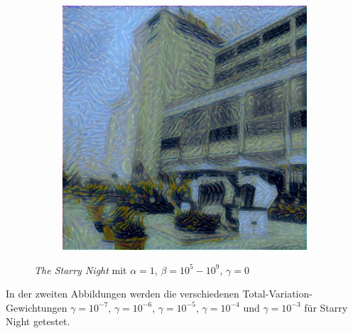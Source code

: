 \begin{figure}[H]
\begin{subfigure}[h]{0.15\textwidth}
    \end{subfigure}
    \begin{subfigure}[h]{0.15\textwidth}
        \centering
        \includegraphics[width=\textwidth]{resources/content/experiments/a__starry_night__768x768__style-weight_1e+09__tv-weight_0e+00.jpg}
    \end{subfigure}
    \caption{\textit{The Starry Night} mit $ \alpha = 1 $, $ \beta = 10^{5} - 10^{9} $, $ \gamma = 0 $}
\end{figure}

In der zweiten Abbildungen werden die verschiedenen Total-Variation-Gewichtungen $ \gamma = 10^{-7} $, $ \gamma = 10^{-6} $, $ \gamma = 10^{-5} $, $ \gamma = 10^{-4} $ und $ \gamma = 10^{-3} $  für Starry Night getestet.

